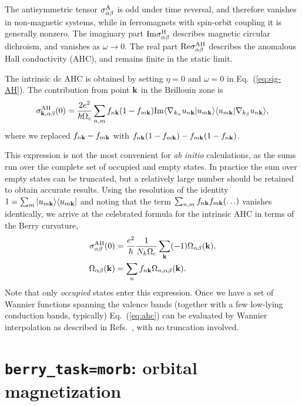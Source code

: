 The antisymmetric tensor $\sigma^{\rm A}_{\alpha\beta}$ is odd under
time reversal, and therefore vanishes in non-magnetic systems, while
in ferromagnets with spin-orbit coupling it is generally nonzero.  The
imaginary part ${\rm Im}\sigma^{\rm H}_{\alpha\beta}$ describes
magnetic circular dichroism, and vanishes as $\omega\rightarrow
0$. The real part ${\rm Re}\sigma^{\rm AH}_{\alpha\beta}$ describes
the anomalous Hall conductivity (AHC), and remains finite in the
static limit.

The intrinsic dc AHC is obtained by setting $\eta=0$ and $\omega=0$ in
Eq.~(\ref{eq:sig-AH}). The contribution from point ${\bf k}$ in the
Brillouin zone is
%
\begin{equation}
\sigma^{\rm AH}_{{\bf k},\alpha\beta}(0)=\frac{2e^2}{\hbar\Omega_c}
\sum_{n,m}f_{n\bf k}(1-f_{m\bf k})
{\rm Im}\langle \nabla_{k_\alpha} u_{n\bf k}\vert u_{m\bf k}\rangle
\langle u_{m\bf k}\vert\nabla_{k_\beta} u_{n\bf k}\rangle,
\end{equation}
%
where we replaced $f_{n\bf k}-f_{m\bf k}$ with 
$f_{n\bf k}(1-f_{m\bf k})-f_{m\bf k}(1-f_{n\bf k})$.

This expression is not the most convenient for {\it ab initio}
calculations, as the sums run over the complete set of occupied and
empty states. In practice the sum over empty states can be truncated,
but a relatively large number should be retained to obtain accurate
results. Using the resolution of the identity $1=\sum_m \vert u_{m\bf
  k}\rangle \langle u_{m\bf k}\vert$ and noting that the term
$\sum_{n,m}f_{n\bf k}f_{m\bf k}(\ldots)$ vanishes identically, we
arrive at the celebrated formula for the intrinsic AHC in terms of the
Berry curvature,
%
\begin{align}
\label{eq:ahc}
\sigma^{\rm AH}_{\alpha\beta}(0)&=\frac{e^2}{\hbar}
\frac{1}{N_k\Omega_c}\sum_{\bf k}(-1)\Omega_{\alpha\beta}({\bf k}),\\
\label{eq:curv-occ}
\Omega_{\alpha\beta}({\bf k})&=\sum_n f_{n\bf k}\Omega_{n,\alpha\beta}({\bf k}).
\end{align}
%
Note that only {\it occupied} states enter this expression.  Once we
have a set of Wannier functions spanning the valence bands (together
with a few low-lying conduction bands, typically) Eq.~(\ref{eq:ahc})
can be evaluated by Wannier interpolation as described in
Refs.~\cite{wang-prb06,lopez-prb12}, with no truncation involved.


\section{{\tt berry\_task=morb}: orbital magnetization}


